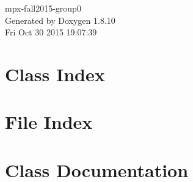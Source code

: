\documentclass[twoside]{book}
\newcommand{\+}{\discretionary{\mbox{\scriptsize$\hookleftarrow$}}{}{}}
\newcommand{\clearemptydoublepage}{%
  \newpage{\pagestyle{empty}\cleardoublepage}%
}
\begin{document}
\hypersetup{pageanchor=false,
             bookmarks=true,
             bookmarksnumbered=true,
             pdfencoding=unicode
            }
\begin{titlepage}
\vspace*{7cm}
\begin{center}%
{\Large mpx-\/fall2015-\/group0 }\\
\vspace*{1cm}
{\large Generated by Doxygen 1.8.10}\\
\vspace*{0.5cm}
{\small Fri Oct 30 2015 19:07:39}\\
\end{center}
\end{titlepage}
\clearemptydoublepage
\tableofcontents
\clearemptydoublepage
{}
\hypersetup{pageanchor=true}

\chapter{Class Index}

\chapter{File Index}

\chapter{Class Documentation}

















\end{document}
